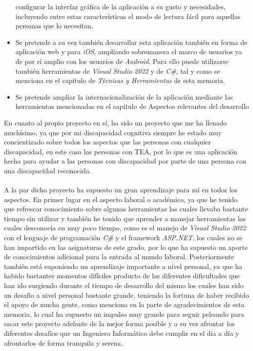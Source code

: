 \begin{itemize}
    configurar la interfaz gráfica de la aplicación a su gusto y necesidades,
    incluyendo entre estas características el modo de lectura fácil para
    aquellas personas que lo necesitan.
    \item Se pretende a su vez también desarrollar esta aplicación también en
    forma de aplicación web y para \textit{iOS}, ampliando sobremanera el marco
    de usuarios ya de por sí amplio con los usuarios de \textit{Android}. Para
    ello puede utilizarse también herramientas de \textit{Visual Studio 2022} y
    de \textit{C\#}, tal y como se menciona en el capítulo de \textit{Técnicas y
    Herramientas} de esta memoria.
    \item Se pretende ampliar la internacionalización de la aplicación mediante
    las herramientas mencionadas en el capítulo de Aspectos relevantes del
    desarrollo
\end{itemize}

En cuanto al propio proyecto en sí, ha sido un proyecto que me ha llenado
muchísimo, ya que por mi discapacidad cognitiva siempre he estado muy
concientizado sobre todos los aspectos que las personas con cualquier
discapacidad, en este caso las personas con TEA, por lo que es una aplicación
hecha para ayudar a las personas con discapacidad por parte de una persona con
una discapacidad reconocida.\\
\\
A la par dicho proyecto ha supuesto un gran aprendizaje para mí en todos los
aspectos. En primer lugar en el aspecto laboral o académico, ya que he tenido
que refrescar conocimiento sobre algunas herramientas las cuales llevaba
bastante tiempo sin utilizar y también he tenido que aprender a manejar
herramientas las cuales desconocía en muy poco tiempo, como es el manejo de
\textit{Visual Studio 2022} con el lenguaje de programación \textit{C\#} y el
framework \textit{ASP.NET}, los cuales no se han impartido en las asignaturas de
este grado, por lo que ha supuesto un aporte de conocimientos adicional para la
entrada al mundo laboral. Posteriormente también está suponiendo un aprendizaje
importante a nivel personal, ya que ha habido bastantes momentos difíciles
producto de las diferentes dificultades que han ido surgiendo durante el tiempo
de desarrollo del mismo los cuales han sido un desafío a nivel personal bastante
grande, teniendo la fortuna de haber recibido el apoyo de mucha gente, como
menciono en la parte de agradecimientos de esta memoria, lo cual ha supuesto un
impulso muy grande para seguir peleando para sacar este proyecto adelante de la
mejor forma posible y a su vez afrontar los diferentes desafíos que un Ingeniero
Informático debe cumplir en el día a día y afrontarlos de forma tranquila y
serena.
